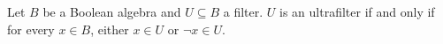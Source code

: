 \begin{proposition} \label{proposition:filter_is_an_ultrafilter_if_and_only_if_every_element_or_negation_is_in_it}
Let $B$ be a Boolean algebra and $U \subseteq B$ a filter. $U$ is an ultrafilter if and only if for every $x \in B$, either $x \in U$ or $\neg x \in U$.
\end{proposition}
